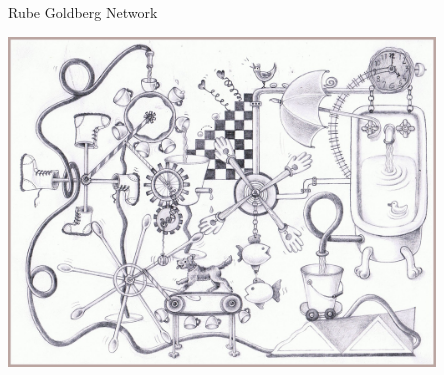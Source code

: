 \documentclass[xcolor=pdftex,x11names,table,hyperref]{beamer}
\begin{document}
\begin{frame}{Rube Goldberg Network}
\begin{center}
\includegraphics[width=0.85\textwidth]{images/rube_goldberg_machine.jpg}
\end{center}

\end{frame}
\end{document}
